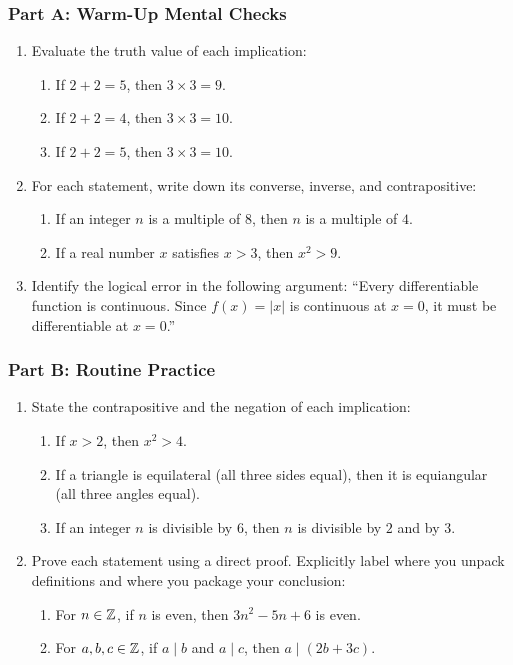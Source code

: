 \subsubsection*{Part A: Warm-Up Mental Checks}
\begin{enumerate}
\item Evaluate the truth value of each implication:
\begin{enumerate}
\item If $2 + 2 = 5$, then $3 \times 3 = 9$.
\item If $2 + 2 = 4$, then $3 \times 3 = 10$.
\item If $2 + 2 = 5$, then $3 \times 3 = 10$.
\end{enumerate}
\item For each statement, write down its converse, inverse, and contrapositive:
\begin{enumerate}
\item If an integer $n$ is a multiple of $8$, then $n$ is a multiple of $4$.
\item If a real number $x$ satisfies $x > 3$, then $x^2 > 9$.
\end{enumerate}
\item Identify the logical error in the following argument: ``Every differentiable function is continuous. Since $f(x) = \lvert x \rvert$ is continuous at $x = 0$, it must be differentiable at $x = 0$.''
\end{enumerate}

\subsubsection*{Part B: Routine Practice}
\begin{enumerate}[resume]
\item State the contrapositive and the negation of each implication:
\begin{enumerate}
\item If $x > 2$, then $x^2 > 4$.
\item If a triangle is equilateral (all three sides equal), then it is equiangular (all three angles equal).
\item If an integer $n$ is divisible by $6$, then $n$ is divisible by $2$ and by $3$.
\end{enumerate}
\item Prove each statement using a direct proof. Explicitly label where you unpack definitions and where you package your conclusion:
\begin{enumerate}
\item For $n \in \mathbb{Z}$, if $n$ is even, then $3n^2 - 5n + 6$ is even.
\item For $a, b, c \in \mathbb{Z}$, if $a \mid b$ and $a \mid c$, then $a \mid (2b + 3c)$.
\end{enumerate}
\end{enumerate}

